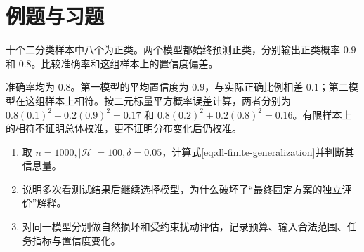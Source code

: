 \section{例题与习题}
\begin{example}
十个二分类样本中八个为正类。两个模型都始终预测正类，分别输出正类概率 $0.9$ 和 $0.8$。比较准确率和这组样本上的置信度偏差。
\end{example}
\begin{solve}
准确率均为 $0.8$。第一模型的平均置信度为 $0.9$，与实际正确比例相差 $0.1$；第二模型在这组样本上相符。按二元标量平方概率误差计算，两者分别为 $0.8(0.1)^2+0.2(0.9)^2=0.17$ 和 $0.8(0.2)^2+0.2(0.8)^2=0.16$。有限样本上的相符不证明总体校准，更不证明分布变化后仍校准。
\end{solve}
\begin{enumerate}
\item 取 $n=1000,|\mathcal H|=100,\delta=0.05$，计算式\eqref{eq:dl-finite-generalization}并判断其信息量。
\item 说明多次看测试结果后继续选择模型，为什么破坏了“最终固定方案的独立评价”解释。
\item 对同一模型分别做自然损坏和受约束扰动评估，记录预算、输入合法范围、任务指标与置信度变化。
\end{enumerate}

